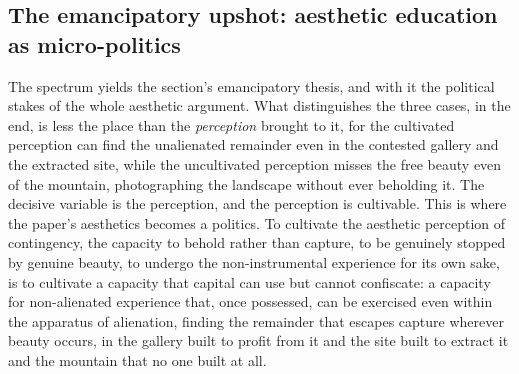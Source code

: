 \subsection{The emancipatory upshot: aesthetic education as micro-politics}
\label{p21:sub:pe-emancipation}

The spectrum yields the section's emancipatory thesis, and with it the political stakes of the whole aesthetic argument. What distinguishes the three cases, in the end, is less the place than the \emph{perception} brought to it, for the cultivated perception can find the unalienated remainder even in the contested gallery and the extracted site, while the uncultivated perception misses the free beauty even of the mountain, photographing the landscape without ever beholding it. The decisive variable is the perception, and the perception is cultivable. This is where the paper's aesthetics becomes a politics. To cultivate the aesthetic perception of contingency, the capacity to behold rather than capture, to be genuinely stopped by genuine beauty, to undergo the non-instrumental experience for its own sake, is to cultivate a capacity that capital can use but cannot confiscate: a capacity for non-alienated experience that, once possessed, can be exercised even within the apparatus of alienation, finding the remainder that escapes capture wherever beauty occurs, in the gallery built to profit from it and the site built to extract it and the mountain that no one built at all.

